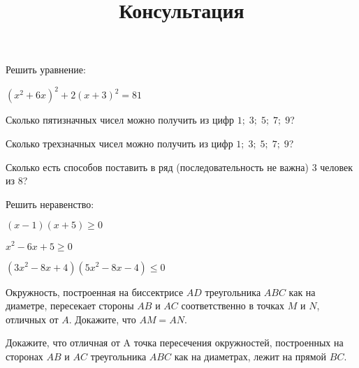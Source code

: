 \begin{listofex}
		\item Решить уравнение:
	\begin{enumcols}[itemcolumns=2]
		\item {}
		\item {}
		\item \( (x^2+6x)^2+2(x+3)^2=81 \) 
		\item {}
	\end{enumcols}
	\item Сколько пятизначных чисел можно получить из цифр \( 1;\;3;\;5;\;7;\;9 \)?
	\item Сколько трехзначных чисел можно получить из цифр \( 1;\;3;\;5;\;7;\;9 \)?
	\item Сколько есть способов поставить в ряд (последовательность не важна) 3 человек из 8?
	\item {}
	\item Решить неравенство:
	\begin{enumcols}[itemcolumns=2]
		\item \( (x-1)(x+5)\ge0 \) \answer{\( [-12;0,5] \)}
		\item \( x^2-6x+5\ge0 \) \answer{\( (-\infty;1]\cup[18;+\infty) \)}
		\item \( (3x^2-8x+4)(5x^2-8x-4)\le0 \)
	\end{enumcols}
\end{listofex}
\newpage
\title{Консультация}
\begin{listofex}
	\item {}
	\item {}
	\item {}
	\item {}
	\item {}
	\item Окружность, построенная на биссектрисе \( AD \) треугольника \( ABC \) как на диаметре, пересекает стороны \( AB \) и \( AC \) соответственно в точках \( M \) и \( N \), отличных от \( A \). Докажите, что \( AM = AN \).
	\item Докажите, что отличная от A точка пересечения окружностей, построенных на сторонах \( AB \) и \( AC \) треугольника \( ABC \) как на диаметрах, лежит на прямой \( BC \).
\end{listofex}